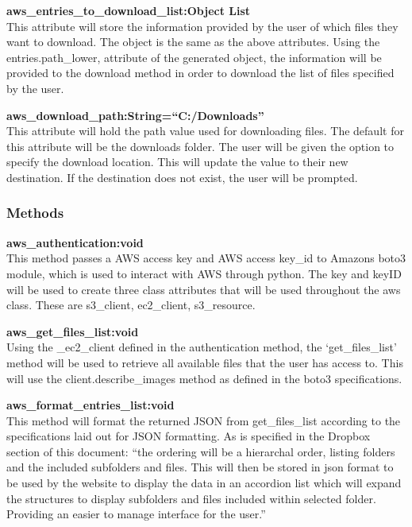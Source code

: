 \textbf{aws\_entries\_to\_download\_list:Object List} \\
    This attribute will store the information provided by the user of which files they want to download. The object is the same as the above 
    attributes. Using the entries.path\_lower, attribute of the generated object, the information will be provided to the download method in 
    order to download the list of files specified by the user.

\textbf{aws\_download\_path:String=``C:/Downloads''} \\
    This attribute will hold the path value used for downloading files. The default for this attribute will be the downloads folder. The user 
    will be given the option to specify the download location. This will update the value to their new destination. If the destination does 
    not exist, the user will be prompted.

\subsubsection{Methods}
\textbf{aws\_authentication:void} \\
    This method passes a AWS access key and AWS access key\_id to Amazons boto3 module, which is used to interact with AWS through python. The key 
    and keyID will be used to create three class attributes that will be used throughout the aws class. These are s3\_client, ec2\_client, s3\_resource.
    
\textbf{aws\_get\_files\_list:void} \\
    Using the \_ec2\_client defined in the authentication method, the `get\_files\_list' method will be used to retrieve all available files that the user 
    has access to. This will use the client.describe\_images method as defined in the boto3 specifications.

\textbf{aws\_format\_entries\_list:void} \\
    This method will format the returned JSON from get\_files\_list according to the specifications laid out for JSON formatting. As is specified in the
    Dropbox section of this document: ``the ordering will be a hierarchal order, listing folders and the included subfolders and files. This will then be stored in json format to be used by the website to display the data in an
    accordion list which will expand the structures to display subfolders and files included within selected folder. Providing an easier to manage
    interface for the user.''

